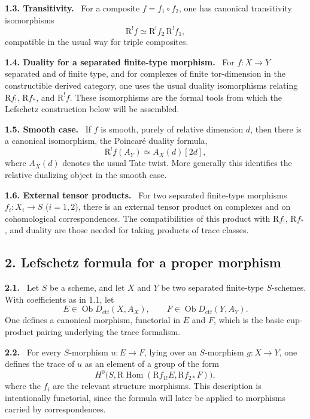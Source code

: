\documentclass[12pt]{article}
\newcommand{\Hom}{\operatorname{Hom}}
\newcommand{\ob}{\operatorname{Ob}}
\newcommand{\R}{\mathrm R}
\newenvironment{statement}[1]{\par\medskip\noindent\textbf{#1.}\ }{\par\medskip}
\begin{document}
\begin{statement}{1.3. Transitivity}
For a composite $f=f_1\circ f_2$, one has canonical transitivity isomorphisms
\[
   \R^!f\simeq \R^!f_2\,\R^!f_1,
\]
compatible in the usual way for triple composites.
\end{statement}

\begin{statement}{1.4. Duality for a separated finite-type morphism}
For $f:X\to Y$ separated and of finite type, and for complexes of finite tor-dimension in the constructible derived category, one uses the usual duality isomorphisms relating $\R f_!$, $\R f_*$, and $\R^!f$. These isomorphisms are the formal tools from which the Lefschetz construction below will be assembled.
\end{statement}

\begin{statement}{1.5. Smooth case}
If $f$ is smooth, purely of relative dimension $d$, then there is a canonical isomorphism, the Poincaré duality formula,
\[
   \R^!f(A_Y)\simeq A_X(d)[2d],
\]
where $A_X(d)$ denotes the usual Tate twist. More generally this identifies the relative dualizing object in the smooth case.
\end{statement}

\begin{statement}{1.6. External tensor products}
For two separated finite-type morphisms $f_i:X_i\to S$ ($i=1,2$), there is an external tensor product on complexes and on cohomological correspondences. The compatibilities of this product with $\R f_!$, $\R f_*$, and duality are those needed for taking products of trace classes.
\end{statement}

\subsection*{2. Lefschetz formula for a proper morphism}

\begin{statement}{2.1}
Let $S$ be a scheme, and let $X$ and $Y$ be two separated finite-type $S$-schemes. With coefficients as in 1.1, let
\[
   E\in\ob D_{\mathrm{ctf}}(X,A_X),
   \qquad F\in\ob D_{\mathrm{ctf}}(Y,A_Y).
\]
One defines a canonical morphism, functorial in $E$ and $F$, which is the basic cup-product pairing underlying the trace formalism.
\end{statement}

\begin{statement}{2.2}
For every $S$-morphism $u:E\to F$, lying over an $S$-morphism $g:X\to Y$, one defines the trace of $u$ as an element of a group of the form
\[
   H^0\bigl(S,\R\Hom(\R f_{1!}E,\R f_{2*}F)\bigr),
\]
where the $f_i$ are the relevant structure morphisms. This description is intentionally functorial, since the formula will later be applied to morphisms carried by correspondences.
\end{statement}
\end{document}
